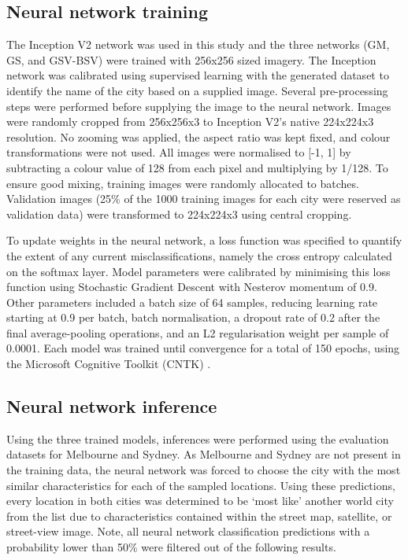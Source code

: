 \documentclass[Crown,sageh,times]{sagej}
\begin{document}
\subsection{Neural network training}\label{sec:methods4}    

The Inception V2 network was used in this study and the three networks (GM, GS, and GSV-BSV) were trained with 256x256 sized imagery. The Inception network was calibrated using supervised learning with the generated dataset to identify the name of the city based on a supplied image. Several pre-processing steps were performed before supplying the image to the neural network. Images were randomly cropped from 256x256x3 to Inception V2's native 224x224x3 resolution. No zooming was applied, the aspect ratio was kept fixed, and colour transformations were not used. All images were normalised to [-1, 1] by subtracting a colour value of 128 from each pixel and multiplying by 1/128. To ensure good mixing, training images were randomly allocated to batches. Validation images (25\% of the 1000 training images for each city were reserved as validation data) were transformed to 224x224x3 using central cropping.


To update weights in the neural network, a loss function was specified to quantify the extent of any current misclassifications, namely the cross entropy calculated on the softmax layer. Model parameters were calibrated by minimising this loss function using Stochastic Gradient Descent with Nesterov momentum of 0.9. Other parameters included a batch size of 64 samples, reducing learning rate starting at 0.9 per batch, batch normalisation, a dropout rate of 0.2 after the final average-pooling operations, and an L2 regularisation weight per sample of 0.0001. Each model was trained until convergence for a total of 150 epochs, using the Microsoft Cognitive Toolkit (CNTK) \citep{Yu2015}. 


\subsection{Neural network inference}\label{sec:methods5}    
Using the three trained models, inferences were performed using the evaluation datasets for Melbourne and Sydney. As Melbourne and Sydney are not present in the training data, the neural network was forced to choose the city with the most similar characteristics for each of the sampled locations. Using these predictions, every location in both cities was determined to be `most like' another world city from the list due to  characteristics contained within the street map, satellite, or street-view image. Note, all neural network classification predictions with a probability lower than 50\% were filtered out of the following results.
\end{document}

